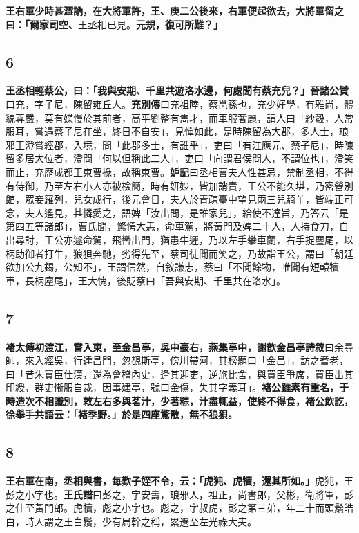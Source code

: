 \textbf{王右軍少時甚澀訥，在大將軍許，王、庾二公後來，右軍便起欲去，大將軍留之曰：「爾家司空、}{\footnotesize 王丞相已見。}\textbf{元規，復可所難？」}

\subsection*{6}

\textbf{王丞相輕蔡公，曰：「我與安期、千里共遊洛水邊，何處聞有蔡充兒？」}{\footnotesize \textbf{晉諸公贊}曰充，字子尼，陳留雍丘人。\textbf{充別傳}曰充祖睦，蔡邕孫也，充少好學，有雅尚，體貌尊嚴，莫有媟慢於其前者，高平劉整有雋才，而車服奢麗，謂人曰「紗縠，人常服耳，嘗遇蔡子尼在坐，終日不自安」，見憚如此，是時陳留為大郡，多人士，琅邪王澄嘗經郡，入境，問「此郡多士，有誰乎」，吏曰「有江應元、蔡子尼」，時陳留多居大位者，澄問「何以但稱此二人」，吏曰「向謂君侯問人，不謂位也」，澄笑而止，充歷成都王東曹掾，故稱東曹。\textbf{妒記}曰丞相曹夫人性甚忌，禁制丞相，不得有侍御，乃至左右小人亦被檢簡，時有妍妙，皆加誚責，王公不能久堪，乃密營別館，眾妾羅列，兒女成行，後元會日，夫人於青疎臺中望見兩三兒騎羊，皆端正可念，夫人遙見，甚憐愛之，語婢「汝出問，是誰家兒」，給使不達旨，乃答云「是第四五等諸郎」，曹氏聞，驚愕大恚，命車駕，將黃門及婢二十人，人持食刀，自出尋討，王公亦遽命駕，飛轡出門，猶患牛遲，乃以左手攀車蘭，右手捉麈尾，以柄助御者打牛，狼狽奔馳，劣得先至，蔡司徒聞而笑之，乃故詣王公，謂曰「朝廷欲加公九錫，公知不」，王謂信然，自敘謙志，蔡曰「不聞餘物，唯聞有短轅犢車，長柄麈尾」，王大愧，後貶蔡曰「吾與安期、千里共在洛水」。}

\subsection*{7}

\textbf{褚太傅初渡江，嘗入東，至金昌亭，吳中豪右，燕集亭中，}{\footnotesize \textbf{謝歆金昌亭詩敘}曰余尋師，來入經吳，行達昌門，忽覩斯亭，傍川帶河，其榜題曰「金昌」，訪之耆老，曰「昔朱買臣仕漢，還為會稽內史，逢其迎吏，逆旅比舍，與買臣爭席，買臣出其印綬，群吏慚服自裁，因事建亭，號曰金傷，失其字義耳」。}\textbf{褚公雖素有重名，于時造次不相識別，敕左右多與茗汁，少著粽，汁盡輒益，使終不得食，褚公飲訖，徐舉手共語云：「褚季野。」於是四座驚散，無不狼狽。}

\subsection*{8}

\textbf{王右軍在南，丞相與書，每歎子姪不令，云：「虎㹠、虎犢，還其所如。」}{\footnotesize 虎㹠，王彭之小字也。\textbf{王氏譜}曰彭之，字安壽，琅邪人，祖正，尚書郎，父彬，衛將軍，彭之仕至黃門郎。虎犢，彪之小字也。彪之，字叔虎，彭之第三弟，年二十而頭鬚皓白，時人謂之王白鬚，少有局幹之稱，累遷至左光祿大夫。}

